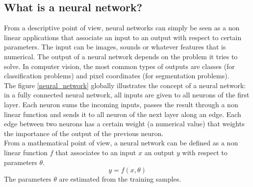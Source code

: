  
\subsection{What is a neural network?}
\label{what_is_a_neural_network}

From a descriptive point of view, neural networks can simply be seen as a non linear applications that associate an input to an output with respect to certain parameters. The input can be images, sounds or whatever features that is numerical. The output of a neural network depends on the problem it tries to solve. In computer vision, the most common types of outputs  are classes (for classification problems) and pixel coordinates (for segmentation problems).\\
The figure \ref{neural_network} globally illustrates the concept of a neural network: in a fully connected neural network,  all inputs are given to all neurons of the first layer. Each neuron sums the incoming inputs, passes the result through a non linear function and sends it to all neuron of the next layer along an edge. Each edge between two neurons has a certain weight (a numerical value) that weights the importance of the output of the previous neuron.\\
From a mathematical point of view, a neural network can be defined as a non linear function $f$ that associates to an input $x$ an output $y$ with respect to parameters $\theta$.
\begin{equation}
y = f(x,\theta)
\end{equation}
The parameters $\theta$ are estimated from the training samples.


